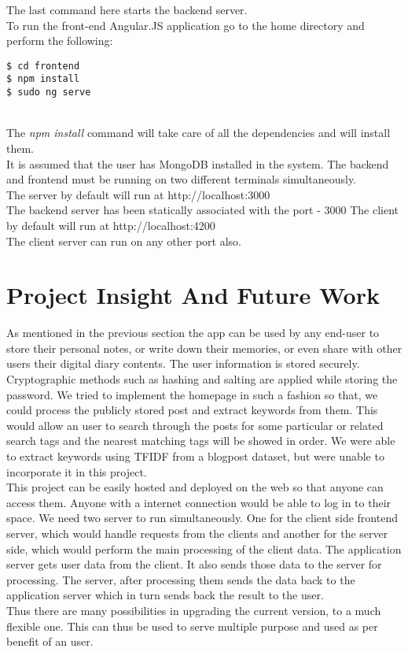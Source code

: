 \documentclass[runningheads]{llncs}
\begin{document}
The last command here starts the backend server.\\
To run the front-end Angular.JS application go to the home directory and perform the following:
\begin{lstlisting}
$ cd frontend
$ npm install
$ sudo ng serve
\end{lstlisting}
\\
The \textit{npm install} command will take care of all the dependencies and will install them.\\
It is assumed that the user has MongoDB installed in the system. The backend and frontend must be running on two different terminals simultaneously. \\
The server by default will run at http://localhost:3000\\
The backend server has been statically associated with the port - 3000
The client by default will run at http://localhost:4200\\
The client server can run on any other port also.

\section{Project Insight And Future Work}
As mentioned in the previous section the app can be used by any end-user to store their personal notes, or write down their memories, or even share with other users their digital diary contents. The user information is stored securely. Cryptographic methods such as hashing and salting are applied while storing the password. We tried to implement the homepage in such a fashion so that, we could process the publicly stored post and extract keywords from them. This would allow an user to search through the posts for some particular or related search tags and the nearest matching tags will be showed in order. We were able to extract keywords using TFIDF from a blogpost dataset, but were unable to incorporate it in this project.
\\

This project can be easily hosted and deployed on the web so that anyone can access them. Anyone with a internet connection would be able to log in to their space. We need two server to run simultaneously. One for the client side frontend server, which would handle requests from the clients and another for the server side, which would perform the main processing of the client data. The application server gets user data from the client. It also sends those data to the server for processing. The server, after processing them sends the data back to the application server which in turn sends back the result to the user.
\\
Thus there are many possibilities in upgrading the current version, to a much flexible one. This can thus be used to serve multiple purpose and used as per benefit of an user.



\end{document}

